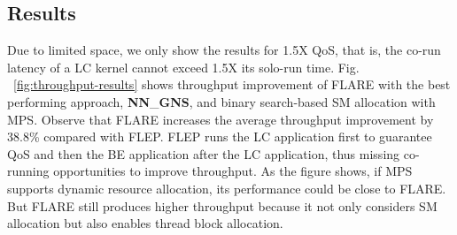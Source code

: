 \subsection{Results}%
Due to limited space, we only show the results for 1.5X QoS, that is, the co-run latency of a LC kernel cannot exceed 1.5X its solo-run time. Fig.%
~\ref{fig:throughput-results} shows throughput improvement %
of FLARE with the best performing approach, \textbf{NN}\_\textbf{GNS}, and binary search-based SM allocation with MPS. %
Observe that FLARE increases the average %
throughput improvement by 38.8\% compared with FLEP. %
FLEP %
runs the LC application first to guarantee QoS and
then the BE application after the LC application, thus missing co-running opportunities to improve throughput.
As the figure shows, if MPS supports dynamic resource allocation, its performance could be close to FLARE. But FLARE still produces higher throughput because it not only considers SM allocation but also enables thread block allocation. 
